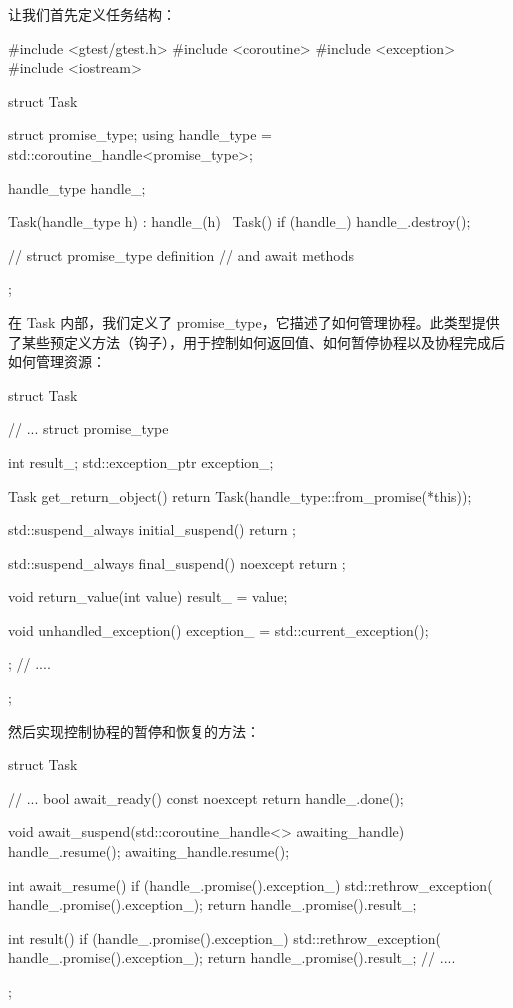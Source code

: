 让我们首先定义任务结构：

\begin{cpp}
#include <gtest/gtest.h>
#include <coroutine>
#include <exception>
#include <iostream>

struct Task {
    struct promise_type;
    using handle_type =
                std::coroutine_handle<promise_type>;

    handle_type handle_;

    Task(handle_type h) : handle_(h) {}
    ~Task() {
        if (handle_) handle_.destroy();
    }

    // struct promise_type definition
    // and await methods
};
\end{cpp}

在 Task 内部，我们定义了 promise\_type，它描述了如何管理协程。此类型提供了某些预定义方法（钩子），用于控制如何返回值、如何暂停协程以及协程完成后如何管理资源：

\begin{cpp}
struct Task {
    // ...
    struct promise_type {
        int result_;
        std::exception_ptr exception_;

        Task get_return_object() {
            return Task(handle_type::from_promise(*this));
        }

        std::suspend_always initial_suspend() {
            return {};
        }

        std::suspend_always final_suspend() noexcept {
            return {};
        }

        void return_value(int value) {
            result_ = value;
        }

        void unhandled_exception() {
            exception_ = std::current_exception();
        }
    };
    // ....
};
\end{cpp}

然后实现控制协程的暂停和恢复的方法：

\begin{cpp}
struct Task {
    // ...
    bool await_ready() const noexcept {
        return handle_.done();
    }

    void await_suspend(std::coroutine_handle<>
                            awaiting_handle) {
        handle_.resume();
        awaiting_handle.resume();
    }

    int await_resume() {
        if (handle_.promise().exception_) {
            std::rethrow_exception(
            handle_.promise().exception_);
        }
        return handle_.promise().result_;
    }

    int result() {
        if (handle_.promise().exception_) {
            std::rethrow_exception(
            handle_.promise().exception_);
        }
        return handle_.promise().result_;
    }
    // ....
};
\end{cpp}

